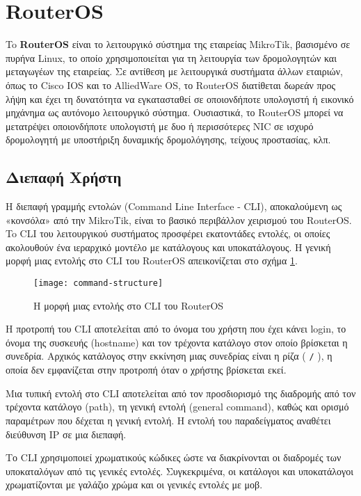 \documentclass{EdipyLabs} %
\begin{document}
\Initialize

\section{RouterOS}
To \textbf{RouterOS} είναι το λειτουργικό σύστημα της εταιρείας MikroTik, βασισμένο σε πυρήνα Linux, το οποίο χρησιμοποιείται για τη λειτουργία των δρομολογητών και μεταγωγέων της εταιρείας. Σε αντίθεση με λειτουργικά συστήματα άλλων εταιριών, όπως το Cisco IOS και το AlliedWare OS, το RouterOS διατίθεται δωρεάν προς λήψη και έχει τη δυνατότητα να εγκατασταθεί σε οποιονδήποτε υπολογιστή ή εικονικό μηχάνημα ως αυτόνομο λειτουργικό σύστημα. Ουσιαστικά, το RouterOS μπορεί να μετατρέψει οποιονδήποτε υπολογιστή με δυο ή περισσότερες NIC σε ισχυρό δρομολογητή με υποστήριξη δυναμικής δρομολόγησης, τείχους προστασίας, κλπ. 

\subsection{Διεπαφή Χρήστη}
Η διεπαφή γραμμής εντολών (Command Line Interface - CLI), αποκαλούμενη ως «κονσόλα» από την MikroTik, είναι το βασικό περιβάλλον χειρισμού του RouterOS. To CLI του λειτουργικού συστήματος προσφέρει εκατοντάδες εντολές, οι οποίες ακολουθούν ένα ιεραρχικό μοντέλο με κατάλογους και υποκατάλογους. H γενική μορφή μιας εντολής στο CLI του RouterOS απεικονίζεται στο σχήμα \ref{fig:command-structure}.

\begin{figure}[H]
	\centering
	\texttt{[image: command-structure]}
	\caption{Η μορφή μιας εντολής στο CLI του RouterOS}\label{fig:command-structure}
\end{figure}

Η προτροπή του CLI αποτελείται από το όνομα του χρήστη που έχει κάνει login, το όνομα της συσκευής (hostname) και τον τρέχοντα κατάλογο στον οποίο βρίσκεται η συνεδρία. Αρχικός κατάλογος στην εκκίνηση μιας συνεδρίας είναι η ρίζα ( \texttt{/} ), η οποία δεν εμφανίζεται στην προτροπή όταν ο χρήστης βρίσκεται εκεί. 

Μια τυπική εντολή στο CLI αποτελείται από τον προσδιορισμό της διαδρομής από τον τρέχοντα κατάλογο (path), τη γενική εντολή (general command), καθώς και ορισμό παραμέτρων που δέχεται η γενική εντολή. Η εντολή του παραδείγματος αναθέτει διεύθυνση IP σε μια διεπαφή.

Το CLI χρησιμοποιεί χρωματικούς κώδικες ώστε να διακρίνονται οι διαδρομές των υποκαταλόγων από τις γενικές εντολές. Συγκεκριμένα, οι κατάλογοι και υποκατάλογοι χρωματίζονται με γαλάζιο χρώμα και οι γενικές εντολές με μοβ.
\end{document}
